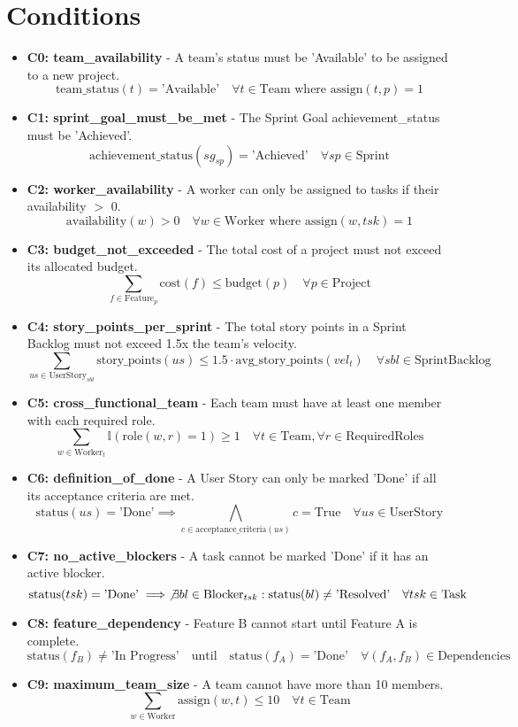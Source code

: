 \documentclass[11pt]{article}
\begin{document}
\section{Conditions}
\begin{itemize}
    \item \textbf{C0: team\_availability} - A team's status must be 'Available' to be assigned to a new project.
        \[ \text{team\_status}(t) = \text{'Available'} \quad \forall t \in \text{Team} \text{ where } \text{assign}(t, p) = 1 \]
    \item \textbf{C1: sprint\_goal\_must\_be\_met} - The Sprint Goal achievement\_status must be 'Achieved'.
        \[ \text{achievement\_status}(sg_{sp}) = \text{'Achieved'} \quad \forall sp \in \text{Sprint} \]
    \item \textbf{C2: worker\_availability} - A worker can only be assigned to tasks if their availability $>$ 0.
        \[ \text{availability}(w) > 0 \quad \forall w \in \text{Worker} \text{ where } \text{assign}(w, tsk) = 1 \]
    \item \textbf{C3: budget\_not\_exceeded} - The total cost of a project must not exceed its allocated budget.
        \[ \sum_{f \in \text{Feature}_p} \text{cost}(f) \leq \text{budget}(p) \quad \forall p \in \text{Project} \]
    \item \textbf{C4: story\_points\_per\_sprint} - The total story points in a Sprint Backlog must not exceed 1.5x the team's velocity.
        \[ \sum_{us \in \text{UserStory}_{sbl}} \text{story\_points}(us) \leq 1.5 \cdot \text{avg\_story\_points}(vel_t) \quad \forall sbl \in \text{SprintBacklog} \]
    \item \textbf{C5: cross\_functional\_team} - Each team must have at least one member with each required role.
        \[ \sum_{w \in \text{Worker}_t} \mathbb{I}(\text{role}(w, r) = 1) \geq 1 \quad \forall t \in \text{Team}, \forall r \in \text{RequiredRoles} \]
    \item \textbf{C6: definition\_of\_done} - A User Story can only be marked 'Done' if all its acceptance criteria are met.
        \[ \text{status}(us) = \text{'Done'} \implies \bigwedge_{c \in \text{acceptance\_criteria}(us)} c = \text{True} \quad \forall us \in \text{UserStory} \]
    \item \textbf{C7: no\_active\_blockers} - A task cannot be marked 'Done' if it has an active blocker.
        \[ \text{status}(tsk) = \text{'Done'} \implies \not\exists bl \in \text{Blocker}_{tsk} : \text{status}(bl) \neq \text{'Resolved'} \quad \forall tsk \in \text{Task} \]
    \item \textbf{C8: feature\_dependency} - Feature B cannot start until Feature A is complete.
        \[ \text{status}(f_B) \neq \text{'In Progress'} \quad \text{until} \quad \text{status}(f_A) = \text{'Done'} \quad \forall (f_A, f_B) \in \text{Dependencies} \]
    \item \textbf{C9: maximum\_team\_size} - A team cannot have more than 10 members.
        \[ \sum_{w \in \text{Worker}} \text{assign}(w, t) \leq 10 \quad \forall t \in \text{Team} \]
\end{itemize}
\end{document}
